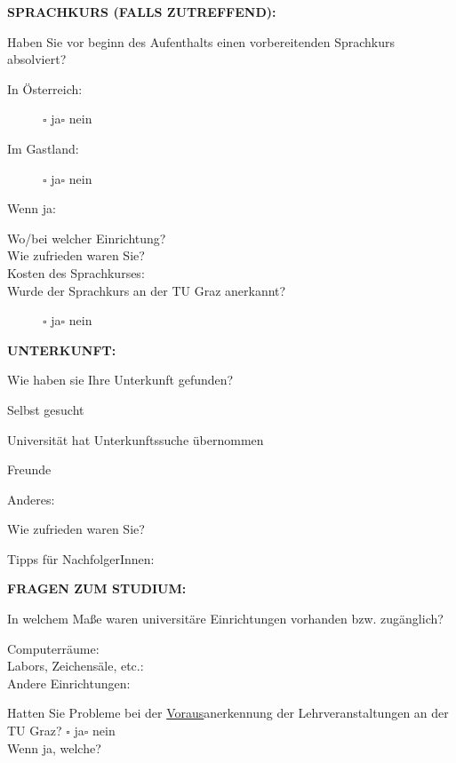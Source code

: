 \documentclass[12pt, a4paper]{article}
\newcommand{\heading}[1]{\bigskip\noindent\textbf{\MakeUppercase{#1}:}\medskip}
\newcommand{\blank}{\hrulefill}
\newcommand{\yesnoboxes}{\hspace{1ex}\(\square\) ja\hspace{5ex}\(\square\) nein}
\begin{document}
\heading{Sprachkurs (\MakeLowercase{falls zutreffend})}

Haben Sie vor beginn des Aufenthalts einen vorbereitenden Sprachkurs absolviert?
\begin{description}
\item[In Österreich:] \yesnoboxes
\item[Im Gastland:] \yesnoboxes
\end{description}
Wenn ja:
\begin{description}
\item[Wo/bei welcher Einrichtung?] \hrulefill
\item[Wie zufrieden waren Sie?] \hrulefill
\item[Kosten des Sprachkurses:] \hrulefill
\item[Wurde der Sprachkurs an der TU Graz anerkannt?] \yesnoboxes
\end{description}


\heading{Unterkunft}

Wie haben sie Ihre Unterkunft gefunden?

\begin{checklist}
\item Selbst gesucht
\item Universität hat Unterkunftssuche übernommen
\item Freunde
\item Anderes: \blank
\end{checklist}

Wie zufrieden waren Sie? \blank 

Tipps für NachfolgerInnen: \blank


\heading{Fragen zum Studium}

In welchem Maße waren universitäre Einrichtungen vorhanden bzw. zugänglich?
\begin{description}
\item[Computerräume:] \blank
\item[Labors, Zeichensäle, etc.:] \blank
\item[Andere Einrichtungen:] \blank
\end{description}

Hatten Sie Probleme bei der \underline{Voraus}anerkennung der Lehrveranstaltungen an der TU Graz?
\hspace{\oldindent}\yesnoboxes \\
Wenn ja, welche? \blank
\end{document}
